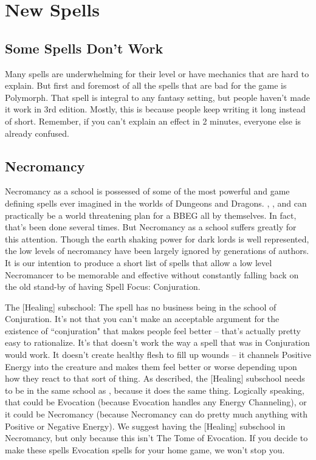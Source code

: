 \section{New Spells}

\subsection{Some Spells Don't Work}

Many spells are underwhelming for their level or have mechanics that are hard to explain. But first and foremost of all the spells that are bad for the game is Polymorph. That spell is integral to any fantasy setting, but people haven't made it work in 3rd edition. Mostly, this is because people keep writing it long instead of short. Remember, if you can't explain an effect in 2 minutes, everyone else is already confused.

\subsection{Necromancy}

Necromancy as a school is possessed of some of the most powerful and game defining spells ever imagined in the worlds of Dungeons and Dragons. , , and  can practically be a world threatening plan for a BBEG all by themselves. In fact, that's been done several times. But Necromancy as a school suffers greatly for this attention. Though the earth shaking power for dark lords is well represented, the low levels of necromancy have been largely ignored by generations of authors. It is our intention to produce a short list of spells that allow a low level Necromancer to be memorable and effective without constantly falling back on the old stand-by of having Spell Focus: Conjuration.

The [Healing] subschool:
The spell  has no business being in the school of Conjuration. It's not that you can't make an acceptable argument for the existence of ``conjuration" that makes people feel better -- that's actually pretty easy to rationalize. It's that  doesn't work the way a spell that was in Conjuration would work. It doesn't create healthy flesh to fill up wounds -- it channels Positive Energy into the creature and makes them feel better or worse depending upon how they react to that sort of thing. As described, the [Healing] subschool needs to be in the same school as , because it does the same thing. Logically speaking, that could be Evocation (because Evocation handles any Energy Channeling), or it could be Necromancy (because Necromancy can do pretty much anything with Positive or Negative Energy). We suggest having the [Healing] subschool in Necromancy, but only because this isn't The Tome of Evocation. If you decide to make these spells Evocation spells for your home game, we won't stop you.\\

